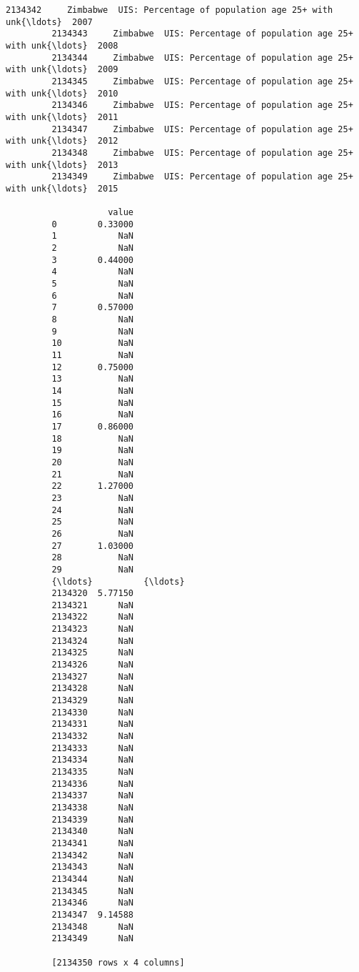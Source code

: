 \documentclass[11pt]{article}
\begin{document}
\begin{Verbatim}[commandchars=\\\{\}]
         2134342     Zimbabwe  UIS: Percentage of population age 25+ with unk{\ldots}  2007   
         2134343     Zimbabwe  UIS: Percentage of population age 25+ with unk{\ldots}  2008   
         2134344     Zimbabwe  UIS: Percentage of population age 25+ with unk{\ldots}  2009   
         2134345     Zimbabwe  UIS: Percentage of population age 25+ with unk{\ldots}  2010   
         2134346     Zimbabwe  UIS: Percentage of population age 25+ with unk{\ldots}  2011   
         2134347     Zimbabwe  UIS: Percentage of population age 25+ with unk{\ldots}  2012   
         2134348     Zimbabwe  UIS: Percentage of population age 25+ with unk{\ldots}  2013   
         2134349     Zimbabwe  UIS: Percentage of population age 25+ with unk{\ldots}  2015   
         
                    value  
         0        0.33000  
         1            NaN  
         2            NaN  
         3        0.44000  
         4            NaN  
         5            NaN  
         6            NaN  
         7        0.57000  
         8            NaN  
         9            NaN  
         10           NaN  
         11           NaN  
         12       0.75000  
         13           NaN  
         14           NaN  
         15           NaN  
         16           NaN  
         17       0.86000  
         18           NaN  
         19           NaN  
         20           NaN  
         21           NaN  
         22       1.27000  
         23           NaN  
         24           NaN  
         25           NaN  
         26           NaN  
         27       1.03000  
         28           NaN  
         29           NaN  
         {\ldots}          {\ldots}  
         2134320  5.77150  
         2134321      NaN  
         2134322      NaN  
         2134323      NaN  
         2134324      NaN  
         2134325      NaN  
         2134326      NaN  
         2134327      NaN  
         2134328      NaN  
         2134329      NaN  
         2134330      NaN  
         2134331      NaN  
         2134332      NaN  
         2134333      NaN  
         2134334      NaN  
         2134335      NaN  
         2134336      NaN  
         2134337      NaN  
         2134338      NaN  
         2134339      NaN  
         2134340      NaN  
         2134341      NaN  
         2134342      NaN  
         2134343      NaN  
         2134344      NaN  
         2134345      NaN  
         2134346      NaN  
         2134347  9.14588  
         2134348      NaN  
         2134349      NaN  
         
         [2134350 rows x 4 columns]
\end{Verbatim}
            
\end{document}
